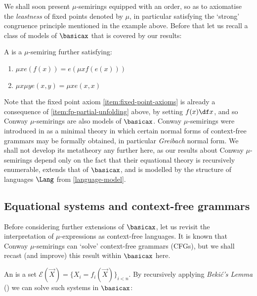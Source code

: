 \documentclass[runningheads]{amsart}
\begin{document}
We shall soon present $\mu$-semirings equipped with an order, so as to axiomatise the \emph{leastness} of fixed points denoted by $\mu$, in particular satisfying the `strong' congruence principle mentioned in the example above.
Before that let us recall a class of models of $\basicax$ that is covered by our results:

\begin{definition}
    A  is a $\mu$-semiring further satisfying:
    \begin{enumerate}
    \item\label{item:fp-partial-unfolding} $\mu x e(f(x)) = e(\mu x f(e(x)))$
        \item\label{item:fp-diagonal} $\mu x \mu y e(x,y) = \mu x e(x,x)$
    \end{enumerate}
\end{definition}

Note that the fixed point axiom \eqref{item:fixed-point-axioms} is already a consequence of \eqref{item:fp-partial-unfolding} above, by setting $f(x)\df x$, and so Conway $\mu$-semirings are also models of $\basicax$.
Conway $\mu$-semirings were introduced in \cite{EsikLeiss05} as a minimal theory in which certain normal forms of context-free grammars may be formally obtained, in particular \emph{Greibach} normal form. 
We shall not develop its metatheory any further here, as our results about Conway $\mu$-semirings depend only on the fact that their equational theory is recursively enumerable, extends that of $\basicax$, and is modelled by the structure of languages $\Lang$ from \cref{language-model}.

\subsection{Equational systems and context-free grammars}
Before considering further extensions of $\basicax$, let us revisit the interpretation of $\mu$-expressions as context-free languages.
It is known that Conway $\mu$-semirings can `solve' context-free grammars (CFGs), but we shall recast (and improve) this result within $\basicax$ here.


An  is a set $\mathcal E (\vec X) = \{X_i = f_i(\vec X)\}_{i<n}$.
 By recursively applying \emph{Beki\'c's Lemma} (\cite{Bekic84}) we can solve such systems in $\basicax$:
\end{document}
